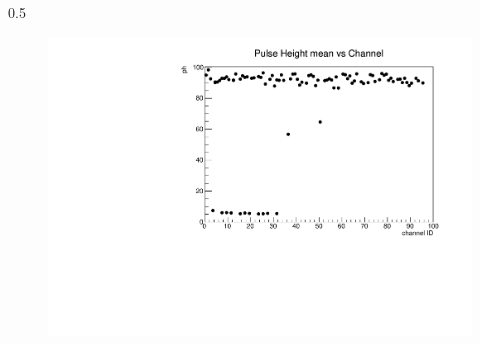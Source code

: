 \documentclass{beamer}
\begin{document}
\begin{frame}
\begin{columns}
\begin{column}{0.5\framewidth}
\begin{figure}[!h]
          \includegraphics[width=1.\columnwidth]{figures/pdf/ph_vs_ch1.pdf}
         \label{fig:normalhits}
    \end{figure}
    \end{column}
    \end{columns}
    \end{frame}
    
\end{document}
